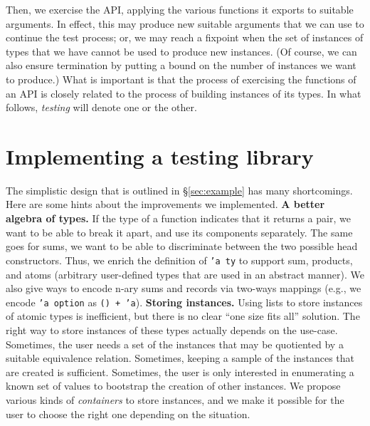 \documentclass[twocolumn,9pt]{article}
\newcommand{\code}[1]{\texttt{#1}}
\newcommand{\sref}[1]{\S\ref{#1}}
\renewcommand\paragraph[1]{\newline\textbf{#1}}
\begin{document}
Then, we exercise the API, applying the various functions it exports
to suitable arguments. In effect, this may produce new suitable
arguments that we can use to continue the test process; or, we may
reach a fixpoint when the set of instances of types that we have
cannot be used to produce new instances. (Of course, we can also
ensure termination by putting a bound on the number of instances we
want to produce.)  What is important is that the process of exercising
the functions of an API is closely related to the process of building
instances of its types. In what follows, \emph{testing} will denote
one or the other.

\section{Implementing a testing library}
The simplistic design that is outlined in \sref{sec:example} has many
shortcomings. Here are some hints about the improvements we
implemented.
%
\paragraph{A better algebra of types.} If the type of a function
indicates that it returns a pair, we want to be able to break it
apart, and use its components separately. The same goes for sums, we
want to be able to discriminate between the two possible head
constructors. Thus, we enrich the definition of \code{'a ty} to
support sum, products, and atoms (arbitrary user-defined types that
are used in an abstract manner). We also give ways to encode n-ary
sums and records via two-ways mappings (e.g., we encode \code{'a
  option} as \code{() + 'a}).
%
\paragraph{Storing instances.} Using lists to store instances of
atomic types is inefficient, but there is no clear ``one size fits
all'' solution. The right way to store instances of these types
actually depends on the use-case.
%
Sometimes, the user needs a set of the instances that may be
quotiented by a suitable equivalence relation.
%
Sometimes, keeping a sample of the instances that are created is
sufficient.
%
Sometimes, the user is only interested in enumerating a known set of
values to bootstrap the creation of other instances.
%
We propose various kinds of \emph{containers} to store instances, and
we make it possible for the user to choose the right one depending on
the situation.
%
\end{document}
